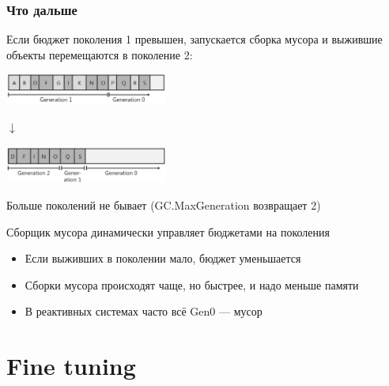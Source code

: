 \documentclass{../../slides-style}
\begin{document}
    \begin{frame}
        \frametitle{Что дальше}
        Если бюджет поколения 1 превышен, запускается сборка мусора и выжившие объекты перемещаются в поколение 2:
        \begin{center}
            \includegraphics[width=0.4\textwidth]{generation1full.png}
        \end{center}
        
        \vspace{-7mm}
        
        \begin{center}\begin{LARGE}$\downarrow$\end{LARGE}\end{center}
    
        \vspace{-7mm}
    
        \begin{center}
            \includegraphics[width=0.4\textwidth]{generation2.png}
        \end{center}
        Больше поколений не бывает (GC.MaxGeneration возвращает 2)

        Сборщик мусора динамически управляет бюджетами на поколения
        \begin{itemize}
            \item Если выживших в поколении мало, бюджет уменьшается
            \item Сборки мусора происходят чаще, но быстрее, и надо меньше памяти
            \item В реактивных системах часто всё Gen0 --- мусор
        \end{itemize}
    \end{frame}

    \section{Fine tuning}
\end{document}
